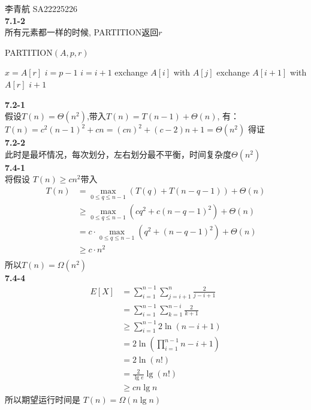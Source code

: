 \documentclass[UTF8]{ctexart}
\begin{document}
李青航 SA22225226\\
\noindent\textbf{7.1-2}\\
所有元素都一样的时候, PARTITION返回$r$
\begin{algorithm}
	\caption {PARTITION$(A,p,r)$}
	\label{alg:1}
	\begin{algorithmic}[1]
		\STATE $x=A[r]$
		\STATE $i=p-1$
				\STATE $i=i+1$
				\STATE exchange $A[i]$ with $A[j]$
			\ENDIF
		\ENDFOR
		\STATE exchange $A[i+1]$ with $A[r]$
		\RETURN $i+1$
		
	\end{algorithmic}
\end{algorithm}

\noindent\textbf{7.2-1}\\
假设$T(n)=\Theta(n^2)$,带入$T(n)=T(n-1)+\Theta(n)$, 有：\\
$T(n)=c^2(n-1)^2+cn=(cn)^2+(c-2)n+1=\Theta(n^2)$
得证\\

\noindent\textbf{7.2-2}\\
此时是最坏情况，每次划分，左右划分最不平衡，时间复杂度$\Theta(n^2)$\\

\noindent\textbf{7.4-1}\\
将假设 $T(n)\ge cn^2$带入
\begin{equation}
\nonumber
\begin{split}
T(n)&=\max_{0\le q \le n-1}(T(q)+T(n-q-1))+\Theta(n)\\
&\ge \max_{0\le q \le n-1}(cq^2+c(n-q-1)^2)+\Theta(n)\\
&=c\cdot \max_{0\le q \le n-1}(q^2+(n-q-1)^2)+\Theta(n)\\
&\ge c\cdot n^2\\
\end{split}
\end{equation}
所以$T(n)=\Omega(n^2)$\\

\noindent\textbf{7.4-4}\\

\begin{equation}
\nonumber
\begin{split}
E[X]&=\sum^{n-1}_{i=1} \sum^{n}_{j=i+1} \frac{2}{j-i+1}\\
&=\sum^{n-1}_{i=1}\sum^{n-i}_{k=1} \frac{2}{k+1}\\
&\ge \sum^{n-1}_{i=1} 2\ln(n-i+1)\\
&=2\ln(\prod^{n-1}_{i=1}n-i+1)\\
&=2\ln(n!)\\
&=\frac{2}{\lg e}\lg(n!)\\
&\ge cn\lg n
\end{split}
\end{equation}
所以期望运行时间是 $T(n)=\Omega(n\lg n)$
\end{document}
